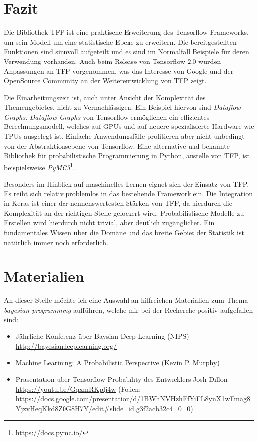 \documentclass[12pt]{article}
\begin{document}
\section{Fazit}

Die Bibliothek TFP ist eine praktische Erweiterung des Tensorflow Frameworks, um sein Modell um eine statistische Ebene zu erweitern. Die bereitgestellten Funktionen sind sinnvoll aufgeteilt und es sind im Normalfall Beispiele für deren Verwendung vorhanden. Auch beim Release von Tensorflow 2.0 wurden Anpassungen an TFP vorgenommen, was das Interesse von Google und der OpenSource Community an der Weiterentwicklung von TFP zeigt. 

Die Einarbeitungszeit ist, auch unter Ansicht der Komplexität des Themengebietes, nicht zu Vernachlässigen. Ein Beispiel hiervon sind \textit{Dataflow Graphs}. \textit{Dataflow Graphs} von Tensorflow ermöglichen ein effizientes Berechnungsmodell, welches auf GPUs und auf neuere spezialisierte Hardware wie TPUs ausgelegt ist. Einfache Anwendungsfälle profitieren aber nicht unbedingt von der Abstraktionsebene von Tensorflow. Eine alternative und bekannte Bibliothek für probabilistische Programmierung in Python, anstelle von TFP, ist beispielsweise \textit{PyMC3}\footnote{\url{https://docs.pymc.io/}}.

Besonders im Hinblick auf maschinelles Lernen eignet sich der Einsatz von TFP. Es reiht sich relativ problemlos in das bestehende Framework ein. Die Integration in Keras ist einer der nennenswertesten Stärken von TFP, da hierdurch die Komplexität an der richtigen Stelle gelockert wird. Probabilistische Modelle zu Erstellen wird hierdurch nicht trivial, aber deutlich zugänglicher. Ein fundamentales Wissen über die Domäne und das breite Gebiet der Statistik ist natürlich immer noch erforderlich. 

\section{Materialien}

An dieser Stelle möchte ich eine Auswahl an hilfreichen Materialien zum Thema \textit{bayesian programming} aufführen, welche mir bei der Recherche positiv aufgefallen sind:
\begin{itemize}
  \item Jährliche Konferenz über Baysian Deep Learning (NIPS) \url{http://bayesiandeeplearning.org/}
  \item Machine Learining: A Probabilistic Perspective (Kevin P. Murphy)\cite{Murphy2012}
  \item Präsentation über Tensorflow Probability des Entwicklers Josh Dillon \url{https://youtu.be/GqxmRKplj4w} (Folien: \url{https://docs.google.com/presentation/d/1BWhNVHzhFfYiFL8ynX1wFmag8YjzvHeqKkd8Z0G8H7Y/edit#slide=id.g3f2acb32c4_0_0})
\end{itemize}


\newpage



\listoffigures
\lstlistoflistings
\end{document}
